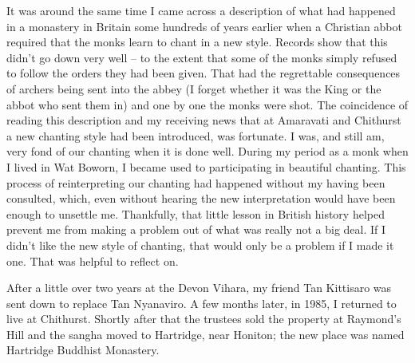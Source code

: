 It was around the same time I came across a description of what had
happened in a monastery in Britain some hundreds of years earlier when a
Christian abbot required that the monks learn to chant in a new style.
Records show that this didn't go down very well -- to the extent that
some of the monks simply refused to follow the orders they had been
given. That had the regrettable consequences of archers being sent into
the abbey (I forget whether it was the King or the abbot who sent them
in) and one by one the monks were shot. The coincidence of reading this
description and my receiving news that at Amaravati and Chithurst a new
chanting style had been introduced, was fortunate. I was, and still am,
very fond of our chanting when it is done well. During my period as a
monk when I lived in Wat Boworn, I became used to participating in
beautiful chanting. This process of reinterpreting our chanting had
happened without my having been consulted, which, even without hearing
the new interpretation would have been enough to unsettle me.
Thankfully, that little lesson in British history helped prevent me from
making a problem out of what was really not a big deal. If I didn't like
the new style of chanting, that would only be a problem if I made it
one. That was helpful to reflect on.

After a little over two years at the Devon Vihara, my friend Tan
Kittisaro was sent down to replace Tan Nyanaviro. A few months later, in
1985, I returned to live at Chithurst. Shortly after that the trustees
sold the property at Raymond's Hill and the sangha moved to Hartridge,
near Honiton; the new place was named
Hartridge Buddhist Monastery\cite{hartridge}.
